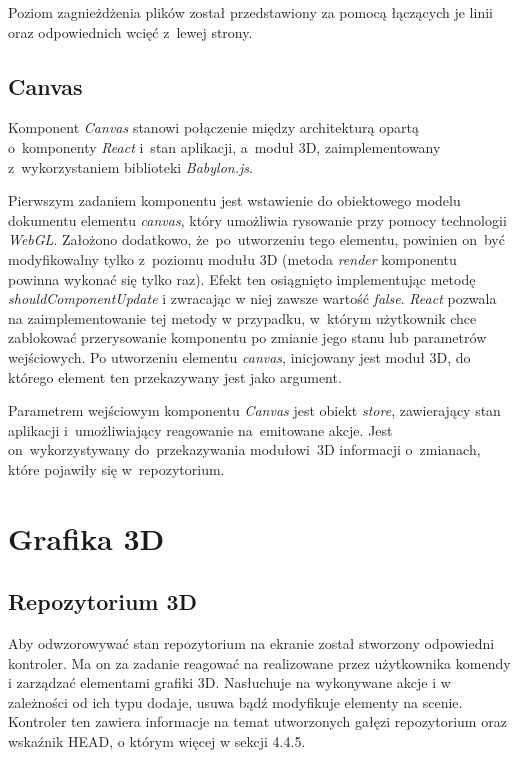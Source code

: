 \documentclass[12pt,a4paper,polish,thesis]{dcsbook}
\begin{document}
{	Poziom zagnieżdżenia plików został przedstawiony za pomocą łączących je linii oraz odpowiednich wcięć z~lewej strony.

	\subsection{Canvas}

	Komponent \textit{Canvas} stanowi połączenie między architekturą opartą o~komponenty \textit{React} i~stan aplikacji, a~moduł 3D, zaimplementowany z~wykorzystaniem biblioteki \textit{Babylon.js}.

	Pierwszym zadaniem komponentu jest wstawienie do obiektowego modelu dokumentu elementu \textit{canvas}, który umożliwia rysowanie przy pomocy technologii \textit{WebGL}. Założono dodatkowo, że~po~utworzeniu tego elementu, powinien on~być modyfikowalny tylko z~poziomu modułu 3D (metoda \textit{render} komponentu powinna wykonać się tylko raz). Efekt ten osiągnięto implementując metodę \textit{shouldComponentUpdate} i zwracając w niej zawsze wartość \textit{false}. \textit{React} pozwala na zaimplementowanie tej metody w przypadku, w~którym użytkownik chce zablokować przerysowanie komponentu po zmianie jego stanu lub parametrów wejściowych. Po utworzeniu elementu \textit{canvas}, inicjowany jest moduł 3D, do którego element ten przekazywany jest jako argument.

	Parametrem wejściowym komponentu \textit{Canvas} jest obiekt \textit{store}, zawierający stan aplikacji i~umożliwiający reagowanie na~emitowane akcje. Jest on~wykorzystywany do~przekazywania modułowi~3D informacji o~zmianach, które pojawiły się w~repozytorium.

	\section{Grafika 3D}

	\subsection{Repozytorium 3D}
	Aby odwzorowywać stan repozytorium na ekranie został stworzony odpowiedni kontroler. Ma on za zadanie reagować na realizowane przez użytkownika komendy i zarządzać elementami grafiki 3D. Nasłuchuje na wykonywane akcje i w zależności od ich typu dodaje, usuwa bądź modyfikuje elementy na scenie. Kontroler ten zawiera informacje na temat utworzonych gałęzi repozytorium oraz wskaźnik HEAD, o którym więcej w sekcji 4.4.5.

}
\end{document}
